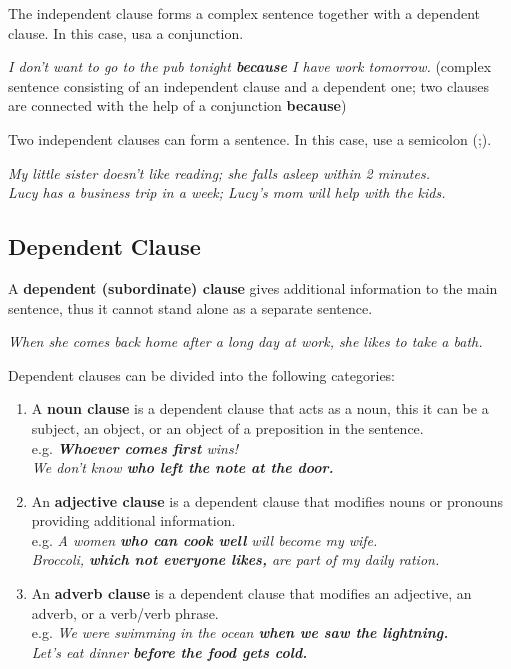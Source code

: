 \documentclass[hidelinks,10pt,a4paper]{article}
\begin{document}
\newpage
The independent clause forms a complex sentence together with a dependent clause. In this case, usa a conjunction.

\begin{center}
	\textit{I don't want to go to the pub tonight \textbf{because} I have work tomorrow.} (complex sentence consisting of an independent clause and a dependent one; two clauses are connected with the help of a conjunction \textbf{because})
\end{center}

Two independent clauses can form a sentence. In this case, use a semicolon (;).

\begin{center}
	\textit{My little sister doesn't like reading; she falls asleep within 2 minutes.}\\
	\textit{Lucy has a business trip in a week; Lucy's mom will help with the kids.}
\end{center}

\subsection{Dependent Clause}
A \textbf{dependent (subordinate) clause} gives additional information to the main sentence, thus it cannot stand alone as a separate sentence.

\begin{center}
	\textit{When she comes back home after a long day at work, she likes to take a bath.}
\end{center}

Dependent clauses can be divided into the following categories:

\begin{enumerate}[label=(\alph*)]
	\item A \textbf{noun clause} is a dependent clause that acts as a noun, this it can be a subject, an object, or an object of a preposition in the sentence.\\
		e.g. \textit{\textbf{Whoever comes first} wins!}\\
		\textit{We don't know \textbf{who left the note at the door.} }

	\item An \textbf{adjective clause} is a dependent clause that modifies nouns or pronouns providing additional information. \\
		e.g. \textit{A women \textbf{who can cook well} will become my wife.}\\
		\textit{Broccoli, \textbf{which not everyone likes,} are part of my daily ration.}

	\item An \textbf{adverb clause} is a dependent clause that modifies an adjective, an adverb, or a verb/verb phrase.\\
		e.g. \textit{We were swimming in the ocean \textbf{when we saw the lightning.}\\
		Let's eat dinner \textbf{before the food gets cold.} }
\end{enumerate}
\end{document}
